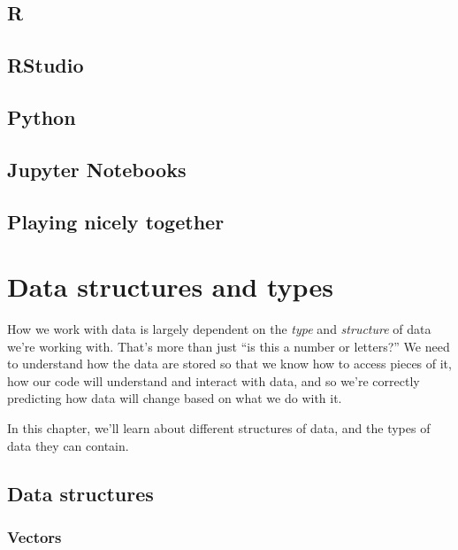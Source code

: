 \documentclass[
]{book}
\begin{document}
\hypertarget{r}{%
\section{R}\label{r}}

\hypertarget{rstudio}{%
\section{RStudio}\label{rstudio}}

\hypertarget{python}{%
\section{Python}\label{python}}

\hypertarget{jupyter-notebooks}{%
\section{Jupyter Notebooks}\label{jupyter-notebooks}}

\hypertarget{playing-nicely-together}{%
\section{Playing nicely together}\label{playing-nicely-together}}

\hypertarget{types}{%
\chapter{Data structures and types}\label{types}}

How we work with data is largely dependent on the \emph{type} and \emph{structure} of data we're working with. That's more than just ``is this a number or letters?'' We need to understand how the data are stored so that we know how to access pieces of it, how our code will understand and interact with data, and so we're correctly predicting how data will change based on what we do with it.

In this chapter, we'll learn about different structures of data, and the types of data they can contain.

\hypertarget{data-structures}{%
\section{Data structures}\label{data-structures}}

\hypertarget{vectors}{%
\subsection{Vectors}\label{vectors}}
\end{document}
